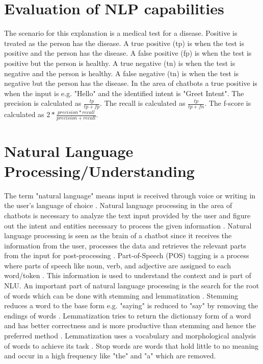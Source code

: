 \section{Evaluation of NLP capabilities}
The scenario for this explanation is a medical test for a disease.
Positive is treated as the person has the disease.
A true positive (tp) is when the test is positive and the person has the disease.
A false positive (fp) is when the test is positive but the person is healthy.
A true negative (tn) is when the test is negative and the person is healthy.
A false negative (tn) is when the test is negative but the person has the disease.
In the area of chatbots a true positive is when the input is e.g. "Hello" and the identified 
intent is "Greet Intent".
The precision is calculated as $\frac{tp}{tp + fp}$.
The recall is calculated as $\frac{tp}{tp + fn}$.
The f-score is calculated as $2 * \frac{precision * recall}{precision + recall}$.

\section{Natural Language Processing/Understanding}   
The term "natural language" means input is received through voice or writing in the user's language of choice \cite{buiildChatbotsPython}.
Natural language processing in the area of chatbots is necessary to analyze the text input 
provided by the user and figure out the intent and entities necessary to process the given information \cite{buiildChatbotsPython}. 
Natural language processing is seen as the brain of a chatbot since it receives the information 
from the user, processes the data and retrieves the relevant parts from the input for post-processing \cite{buiildChatbotsPython}.
Part-of-Speech (POS) tagging is a process where parts of
speech like noun, verb, and adjective are assigned to each word/token \cite{buiildChatbotsPython}.
This information is used to understand the context and is part of NLU.
An important part of natural language processing is the search for the root of words which can be done with 
stemming and lemmatization \cite{buiildChatbotsPython}.
Stemming reduces a word to the base form e.g. "saying" is reduced to "say" by removing the endings of words \cite{buiildChatbotsPython}.
Lemmatization tries to return the dictionary form of a word and has better correctness and is more
 productive than stemming and hence the preferred method \cite{buiildChatbotsPython}. 
 Lemmatization uses a vocabulary and morphological analysis of words to achieve its task \cite{buiildChatbotsPython}.
Stop words are words that hold little to no meaning and occur in a high frequency like "the" and "a" which 
are removed.




